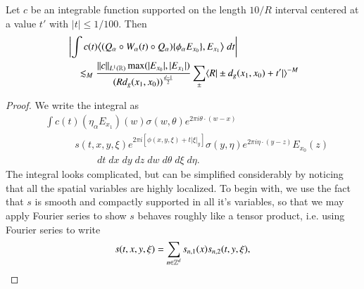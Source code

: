 \begin{lemma}
    Let $c$ be an integrable function supported on the length $10/R$ interval centered at a value $t'$ with $|t| \leq 1/100$. Then
    \begin{align*}
        & \left| \int c(t) \big\langle (Q_\alpha \circ W_\alpha(t) \circ Q_\alpha) \{ \phi_\alpha E_{x_0} \}, E_{x_1} \big\rangle\; dt \right|\\
        &\quad \lesssim_M \frac{\| c \|_{L^1(\operatorname{\mathbb{R}})} \max( |E_{x_0}|, |E_{x_1}| ) }{( R d_g(x_1,x_0) )^{\frac{d-1}{2}}} \sum_{\pm} \langle R | \pm d_g(x_1,x_0) + t' | \rangle^{-M}
    \end{align*}
\end{lemma}
\begin{proof}
    We write the integral as
    \begin{align*}
        &\int c(t) (\eta_\alpha E_{x_1})(w)  \sigma(w,\theta) e^{2 \pi i \theta \cdot (w - x)}\\
        &\quad\quad\quad s(t,x,y,\xi) e^{2 \pi i [ \phi(x,y,\xi) + t |\xi|_y ]} \sigma(y,\eta) e^{2 \pi i \eta \cdot (y - z)} E_{x_0}(z)\\
        &\quad\quad\quad\quad\quad \; dt\; dx\; dy\; dz\; dw\; d\theta\; d\xi\; d\eta.
    \end{align*}
    The integral looks complicated, but can be simplified considerably by noticing that all the spatial variables are highly localized. To begin with, we use the fact that $s$ is smooth and compactly supported in all it's variables, so that we may apply Fourier series to show $s$ behaves roughly like a tensor product, i.e. using Fourier series to write
    \[ s(t,x,y,\xi) = \sum_{n \in \operatorname{\mathbb{Z}}^d} s_{n,1}(x) s_{n,2}(t,y,\xi), \]

\end{proof}
